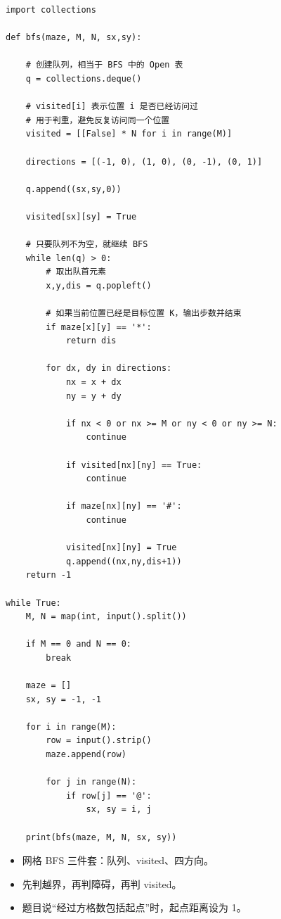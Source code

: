 \documentclass[10pt,a4paper,fontset=none]{ctexart}
\begin{document}
\begin{lstlisting}[style=py,caption={最终可用代码（对话来源）}]
import collections

def bfs(maze, M, N, sx,sy):

    # 创建队列，相当于 BFS 中的 Open 表
    q = collections.deque()

    # visited[i] 表示位置 i 是否已经访问过
    # 用于判重，避免反复访问同一个位置
    visited = [[False] * N for i in range(M)]

    directions = [(-1, 0), (1, 0), (0, -1), (0, 1)]

    q.append((sx,sy,0))

    visited[sx][sy] = True

    # 只要队列不为空，就继续 BFS
    while len(q) > 0:
        # 取出队首元素
        x,y,dis = q.popleft()

        # 如果当前位置已经是目标位置 K，输出步数并结束
        if maze[x][y] == '*':
            return dis
        
        for dx, dy in directions:
            nx = x + dx
            ny = y + dy

            if nx < 0 or nx >= M or ny < 0 or ny >= N:
                continue

            if visited[nx][ny] == True:
                continue

            if maze[nx][ny] == '#':
                continue

            visited[nx][ny] = True
            q.append((nx,ny,dis+1))
    return -1

while True:
    M, N = map(int, input().split())

    if M == 0 and N == 0:
        break

    maze = []
    sx, sy = -1, -1

    for i in range(M):
        row = input().strip()
        maze.append(row)

        for j in range(N):
            if row[j] == '@':
                sx, sy = i, j

    print(bfs(maze, M, N, sx, sy))
\end{lstlisting}
\begin{notebox}
\begin{itemize}
  \item 网格 BFS 三件套：队列、visited、四方向。
  \item 先判越界，再判障碍，再判 visited。
  \item 题目说“经过方格数包括起点”时，起点距离设为 1。
\end{itemize}
\end{notebox}
\end{document}
